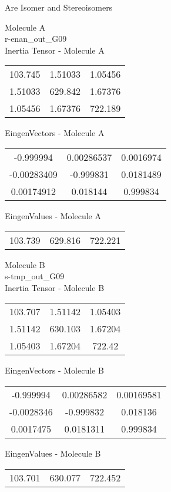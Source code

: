 \begin{center}
\vtab
\vtab
\textcolor{NavyBlue}{\Large Are Isomer and Stereoisomers}
\end{center}
\newpage
\begin{multicols}{2}
\begin{center}
Molecule A \\ 
r-enan\_out\_G09
\\
Inertia Tensor - Molecule A \\
\vtab
\begin{tabular}{|c c c|}
103.745	 & 	1.51033	 & 	1.05456	 \\
1.51033	 & 	629.842	 & 	1.67376	 \\
1.05456	 & 	1.67376	 & 	722.189
\end{tabular}

\vtab
 EingenVectors - Molecule A     \\
\vtab
\begin{tabular}{|c c c|}
-0.999994	 & 	0.00286537	 & 	0.0016974	 \\
-0.00283409	 & 	-0.999831	 & 	0.0181489	 \\
0.00174912	 & 	0.018144	 & 	0.999834
\end{tabular}

\vtab
 EingenValues - Molecule A     \\
\vtab
\begin{tabular}{|c c c|}
103.739	 & 	629.816	 & 	722.221
\end{tabular}
\columnbreak

Molecule B \\ 
s-tmp\_out\_G09
\\
Inertia Tensor - Molecule B \\
\vtab
\begin{tabular}{|c c c|}
103.707	 & 	1.51142	 & 	1.05403	 \\
1.51142	 & 	630.103	 & 	1.67204	 \\
1.05403	 & 	1.67204	 & 	722.42
\end{tabular}

\vtab
 EingenVectors - Molecule B     \\
\vtab
\begin{tabular}{|c c c|}
-0.999994	 & 	0.00286582	 & 	0.00169581	 \\
-0.0028346	 & 	-0.999832	 & 	0.018136	 \\
0.0017475	 & 	0.0181311	 & 	0.999834
\end{tabular}

\vtab
 EingenValues - Molecule B     \\
\vtab
\begin{tabular}{|c c c|}
103.701	 & 	630.077	 & 	722.452
\end{tabular}

\end{center}
\end{multicols}
